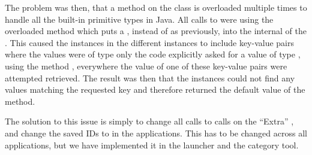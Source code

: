 The problem was then, that a method  on the  class is overloaded multiple times to handle all the built-in primitive types in Java. All calls to  were using the overloaded method which puts a , instead of  as previously, into the internal  of the . This caused the  instances in the different  instances to include key-value pairs where the values were of type  only the code explicitly asked for a value of type , using the method , everywhere the value of one of these key-value pairs were attempted retrieved. The result was then that the  instances could not find any  values matching the requested key and therefore returned the default value of the  method.     

The solution to this issue is simply to change all  calls to  calls on the ``Extra'' , and change the saved IDs to  in the applications. This has to be changed across all applications, but we have implemented it in the launcher and the category tool. 